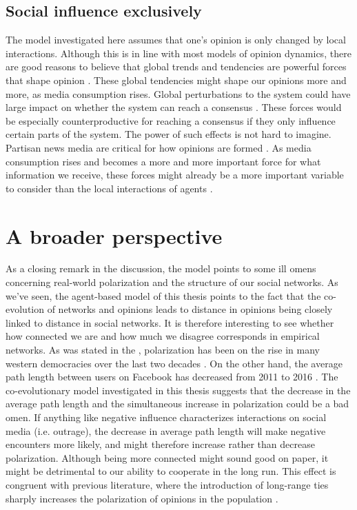 \documentclass[11pt]{article}
\begin{document}
\subsection{Social influence exclusively}
The model investigated here assumes that one’s opinion is only changed by local interactions. Although this is in line with most models of opinion dynamics, there are good reasons to believe that global trends and tendencies are powerful forces that shape opinion \cite{bener_empirical_2016}. These global tendencies might shape our opinions more and more, as media consumption rises. Global perturbations to the system could have large impact on whether the system can reach a consensus \cite{macy2021polarization}. These forces would be especially counterproductive for reaching a consensus if they only influence certain parts of the system. The power of such effects is not hard to imagine. Partisan news media are critical for how opinions are formed \cite{pennycook_lazy_2019}. As media consumption rises and becomes a more and more important force for what information we receive, these forces might already be a more important variable to consider than the local interactions of agents \cite{bener_empirical_2016,stromback_dynamics_2013}. 

\section{A broader perspective}
As a closing remark in the discussion, the model points to some ill omens concerning real-world polarization and the structure of our social networks. 
As we've seen, the agent-based model of this thesis points to the fact that the co-evolution of networks and opinions leads to distance in opinions being closely linked to distance in social networks. 
It is therefore interesting to see whether how connected we are and how much we disagree corresponds in empirical networks. 
As was stated in the \textit{}, polarization has been on the rise in many western democracies over the last two decades \cite{boxell_cross-country_2020,pew_research_center_political_2014}. On the other hand, the average path length between users on Facebook has decreased from 2011 to 2016 \cite{bhagat_three_2016}. The co-evolutionary model investigated in this thesis suggests that the decrease in the average path length and the simultaneous increase in polarization could be a bad omen. If anything like negative influence characterizes interactions on social media (i.e. outrage), the decrease in average path length will make negative encounters more likely, and might therefore increase rather than decrease polarization. Although being more connected might sound good on paper, it might be detrimental to our ability to cooperate in the long run. This effect is congruent with previous literature, where the introduction of long-range ties sharply increases the polarization of opinions in the population \cite{flache_small_2011,turner_paths_2018}.
\end{document}
